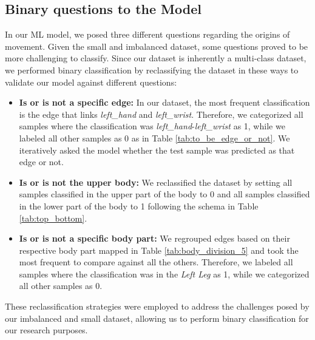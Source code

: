 \subsection{Binary questions to the Model}

In our ML model, we posed three different questions regarding the origins of movement. 
Given the small and imbalanced dataset, some questions proved to be more challenging to classify. 
Since our dataset is inherently a multi-class dataset, we performed binary classification by reclassifying the dataset in these ways to validate our model against different questions:

\begin{itemize}

    \item \textbf{Is or is not a specific edge:} In our dataset, the most frequent classification is the edge that links \textit{left\_hand} and \textit{left\_wrist}. 
    Therefore, we categorized all samples where the classification was \textit{left\_hand}-\textit{left\_wrist} as 1, while we labeled all other samples as 0 as in Table \ref{tab:to_be_edge_or_not}. 
    We iteratively asked the model whether the test sample was predicted as that edge or not.  
    
    \item \textbf{Is or is not the upper body:} We reclassified the dataset by setting all samples classified in the upper part of the body to 0 and all samples classified in the lower part of the body to 1 following the schema in Table \ref{tab:top_bottom}.
    
    \item \textbf{Is or is not a specific body part:} We regrouped edges based on their respective body part mapped in Table \ref{tab:body_division_5} and took the most frequent to compare against all the others.
    Therefore, we labeled all samples where the classification was in the \textit{Left Leg} as 1, while we categorized all other samples as 0.

\end{itemize}
These reclassification strategies were employed to address the challenges posed by our imbalanced and small dataset, allowing us to perform binary classification for our research purposes.

